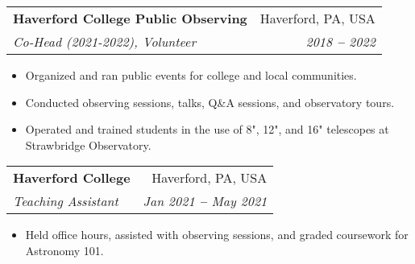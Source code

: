 \documentclass[letterpaper,11pt]{article}
\makeatletter
\newcommand{\resumeItem}[1]{
  \item\small{
    {#1 \vspace{-2pt}}
  }
}
\newcommand{\resumeSubheading}[4]{
  \vspace{-2pt}\item
    \begin{tabular*}{0.97\textwidth}[t]{l@{\extracolsep{\fill}}r}
      \textbf{#1} & #2 \\
      \textit{\small#3} & \textit{\small #4} \\
    \end{tabular*}\vspace{-7pt}
}
\newcommand{\resumeItemListStart}{\begin{itemize}}
\newcommand{\resumeItemListEnd}{\end{itemize}\vspace{-5pt}}
\makeatother
\begin{document}
    \resumeSubheading
      {Haverford College Public Observing}{Haverford, PA, USA}
      {Co-Head (2021-2022), Volunteer}{2018 \textbf{--} 2022}
        \resumeItemListStart
            \resumeItem{Organized and ran public events for college and local communities.}
            \resumeItem{Conducted observing sessions, talks, Q\&A sessions, and observatory tours.}
            \resumeItem{Operated and trained students in the use of 8", 12", and 16" telescopes at Strawbridge Observatory.}
        \resumeItemListEnd
    
    \resumeSubheading
      {Haverford College}{Haverford, PA, USA}
      {Teaching Assistant}{Jan 2021 \textbf{--} May 2021}
        \resumeItemListStart
            \resumeItem{Held office hours, assisted with observing sessions, and graded coursework for Astronomy 101.}
        \resumeItemListEnd
    

    
\end{document}
